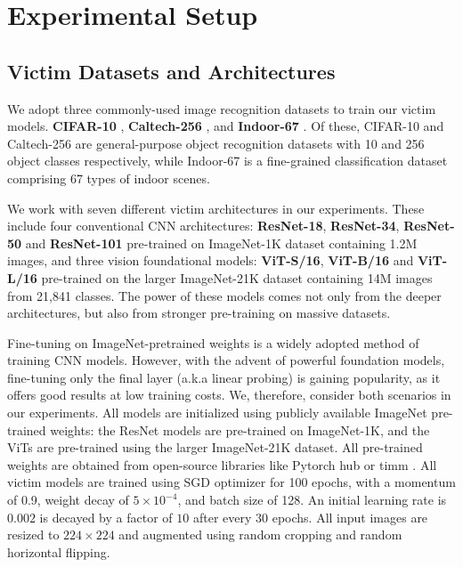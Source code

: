 
\section{Experimental Setup}

\subsection{Victim Datasets and Architectures}

%
We adopt three commonly-used image recognition datasets to train our victim models.
 \textbf{CIFAR-10} \cite{krizhevsky2009learning}, \textbf{Caltech-256} \cite{griffin2007caltech}, and  \textbf{Indoor-67} \cite{quattoni2009recognizing}. Of these, CIFAR-10 and Caltech-256 are general-purpose object recognition datasets with 10 and 256 object classes respectively, while Indoor-67 is a fine-grained classification dataset comprising 67 types of indoor scenes.

We work with seven different victim architectures in our experiments. These include four conventional CNN architectures: \textbf{ResNet-18}, \textbf{ResNet-34}, \textbf{ResNet-50} and \textbf{ResNet-101} \cite{he2016deep} pre-trained on ImageNet-1K dataset \cite{russakovsky2015imagenet} containing 1.2M images, and three vision foundational models: \textbf{ViT-S/16}, \textbf{ViT-B/16} and \textbf{ViT-L/16} \cite{dosovitskiy2020image} pre-trained on the larger ImageNet-21K dataset \cite{deng2009imagenet} containing 14M images from 21,841 classes. 
The power of these models comes not only from the deeper architectures, but also from stronger pre-training on massive datasets.  

Fine-tuning on ImageNet-pretrained weights is a widely adopted method of training CNN models. However, with the advent of powerful foundation models, fine-tuning only the final layer (a.k.a linear probing) is gaining popularity, as it offers good results at low training costs. We, therefore, consider both scenarios in our experiments. 
All models are initialized using publicly available ImageNet \cite{russakovsky2015imagenet} pre-trained weights: the ResNet models are pre-trained on ImageNet-1K, and the ViTs are pre-trained using the larger ImageNet-21K dataset. All pre-trained weights are obtained from open-source libraries like Pytorch hub \cite{torchhub} or timm \cite{rw2019timm}.
%
All victim models are trained using SGD optimizer for 100 epochs, with a momentum of 0.9, weight decay of $5 \times 10^{-4}$, and batch size of 128. An initial learning rate is $0.002$ is decayed by a factor of $10$ after every 30 epochs. All input images are resized to $224\times224$ and augmented using random cropping and random horizontal flipping. 




